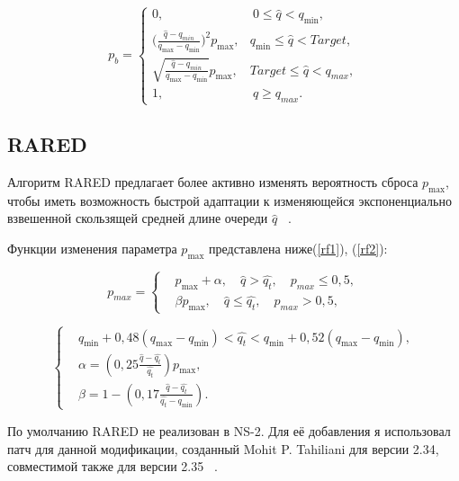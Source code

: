 \begin{equation}
\label{SmRED}
p_{b} = \begin{cases}
        0, &  \ 0 \leqslant \hat{q} < q_{\min},
        \\
        ({\frac{\hat{q} - q_{min}}{q_{\max} - q_{\min}})^2} {p_{\max}}, &  q_{\min} \leqslant  \hat{q} < {Target},
        \\
        \sqrt{{\frac{\hat{q} - q_{min}}{q_{\max} - q_{\min}}}} {p_{\max}}, & {Target} \leqslant  \hat{q} < q_{max},
        \\
        1, &  \ \hat{q} \geqslant q_{max}.
\end{cases}
\end{equation}
 

\subsection{RARED}

Алгоритм RARED предлагает более активно изменять вероятность сброса $p_{\max}$,
чтобы иметь возможность быстрой адаптации к изменяющейся
экспоненциально взвешенной скользящей средней длине очереди $\hat{q}$ ~\cite{RARED}.

Функции изменения параметра $p_{\max}$ представлена ниже(\eqref{rf1}), (\eqref{rf2}):

\begin{equation}
\label{rf1}
p_{max} = \left\{
  \begin{aligned}
& p_{\max}+\alpha, \quad  \hat{q}>\hat{q_{t}}, \quad p_{max} \leqslant 0,5, \\
& \beta p_{\max}, \quad \hat{q}\leqslant\hat{q_{t}}, \quad p_{max} > 0,5,
  \end{aligned}
\right.
\end{equation}

\begin{equation}
\label{rf2}
\left\{
  \begin{aligned}
    & q_{\min}+0,48\left(q_{\max}-q_{\min}\right) < \hat{q_t} < q_{\min}+0,52\left(q_{\max}-q_{\min}\right), \\
    & \alpha=\left(0,25\frac{\hat{q}-\hat{q_t}}{\hat{q_t}} \right)p_{\max}, \\ 
    & \beta=1-\left(0,17\frac{\hat{q}-\hat{q_t}}{\hat{q_t}-q_{\min}}\right).
  \end{aligned}
\right.
\end{equation}


По умолчанию RARED не реализован в NS-2. Для её добавления я использовал патч для данной модификации, созданный Mohit
  P. Tahiliani для версии 2.34, совместимой также для версии 2.35 ~\cite{refinedpatch}. 

